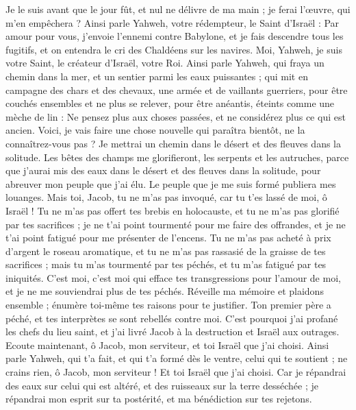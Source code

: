 \begin{multicols}{2}
Je le suis avant que le jour fût, et nul ne délivre de ma main ; je ferai l'œuvre, qui m'en empêchera ?
Ainsi parle Yahweh, votre rédempteur, le Saint d'Israël : Par amour pour vous, j'envoie l'ennemi contre Babylone, et je fais descendre tous les fugitifs, et on entendra le cri des Chaldéens sur les navires.
Moi, Yahweh, je suis votre Saint, le créateur d'Israël, votre Roi.
Ainsi parle Yahweh, qui fraya un chemin dans la mer, et un sentier parmi les eaux puissantes ;
qui mit en campagne des chars et des chevaux, une armée et de vaillants guerriers, pour être couchés ensembles et ne plus se relever, pour être anéantis, éteints comme une mèche de lin :
Ne pensez plus aux choses passées, et ne considérez plus ce qui est ancien.
Voici, je vais faire une chose nouvelle qui paraîtra bientôt, ne la connaîtrez-vous pas ? Je mettrai un chemin dans le désert et des fleuves dans la solitude.
Les bêtes des champs me glorifieront, les serpents et les autruches, parce que j'aurai mis des eaux dans le désert et des fleuves dans la solitude, pour abreuver mon peuple que j'ai élu.
Le peuple que je me suis formé publiera mes louanges.
Mais toi, Jacob, tu ne m'as pas invoqué, car tu t'es lassé de moi, ô Israël !
Tu ne m'as pas offert tes brebis en holocauste, et tu ne m'as pas glorifié par tes sacrifices ; je ne t'ai point tourmenté pour me faire des offrandes, et je ne t'ai point fatigué pour me présenter de l'encens.
Tu ne m'as pas acheté à prix d'argent le roseau aromatique, et tu ne m'as pas rassasié de la graisse de tes sacrifices ; mais tu m'as tourmenté par tes péchés, et tu m'as fatigué par tes iniquités.
C'est moi, c'est moi qui efface tes transgressions pour l'amour de moi, et je ne me souviendrai plus de tes péchés.
Réveille ma mémoire et plaidons ensemble ; énumère toi-même tes raisons pour te justifier.
Ton premier père a péché, et tes interprètes se sont rebellés contre moi.
C'est pourquoi j'ai profané les chefs du lieu saint, et j'ai livré Jacob à la destruction et Israël aux outrages.
\VerseOne{}Ecoute maintenant, ô Jacob, mon serviteur, et toi Israël que j'ai choisi.
Ainsi parle Yahweh, qui t'a fait, et qui t'a formé dès le ventre, celui qui te soutient ; ne crains rien, ô Jacob, mon serviteur ! Et toi Israël que j'ai choisi.
Car je répandrai des eaux sur celui qui est altéré, et des ruisseaux sur la terre desséchée ; je répandrai mon esprit sur ta postérité, et ma bénédiction sur tes rejetons.

\end{multicols}
